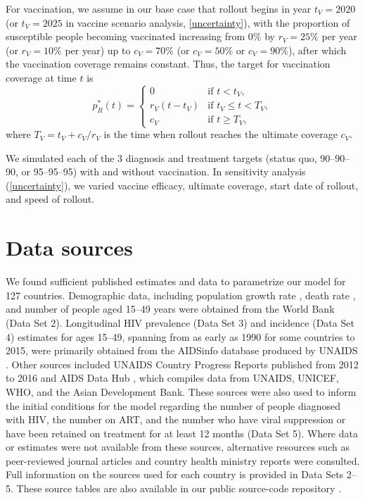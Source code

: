 \documentclass{article}
\begin{document}
For vaccination, we assume in our base case that rollout begins in
year $t_V = 2020$ (or $t_V = 2025$ in vaccine scenario analysis,
\autoref{uncertainty}), with the proportion of susceptible people
becoming vaccinated increasing from 0\% by $r_V = 25\%$ per year (or
$r_V = 10\%$ per year) up to $c_V = 70\%$ (or $c_V = 50\%$ or
$c_V = 90\%$), after which the vaccination coverage remains constant.
Thus, the target for vaccination coverage at time $t$ is
\begin{equation}
  \label{vaccination_target}
  p_R^*(t) =
  \begin{cases}
    0 & \text{if $t < t_V$},
    \\
    r_V (t - t_V) & \text{if $t_V \leq t < T_V$},
    \\
    c_V & \text{if $t \geq T_V$},
  \end{cases}
\end{equation}
where $T_V = t_V + c_V / r_V$ is the time when rollout reaches
the ultimate coverage $c_V$.

We simulated each of the 3 diagnosis and treatment targets (status
quo, 90--90--90, or 95--95--95) with and without vaccination.  In
sensitivity analysis (\autoref{uncertainty}), we varied vaccine
efficacy, ultimate coverage, start date of rollout, and speed of
rollout.


\section{Data sources}
\label{data_sources}

We found sufficient published estimates and data to parametrize our
model for 127 countries.  Demographic data, including population
growth rate \cite{WorldBankpg}, death
rate \cite{World_Development_Indicators2013-ee}, and number of people
aged 15--49 years \cite{The_World_Bank2016-fd} were obtained from the
World Bank (Data Set 2). Longitudinal HIV prevalence
(Data Set 3) and incidence (Data Set 4)
estimates for ages 15--49, spanning from as early as 1990 for some
countries to 2015, were primarily obtained from the AIDSinfo database
produced by UNAIDS \cite{Unaids2016-an}. Other sources included UNAIDS
Country Progress Reports \cite{Unaids2016-am} published from 2012 to
2016 and AIDS Data Hub \cite{AIDSdatahub-fg}, which compiles data from
UNAIDS, UNICEF, WHO, and the Asian Development Bank.  These sources
were also used to inform the initial conditions for the model
regarding the number of people diagnosed with HIV, the number on ART,
and the number who have viral suppression or have been retained on
treatment for at least 12 months (Data Set 5).  Where data
or estimates were not available from these sources, alternative
resources such as peer-reviewed journal articles and country health
ministry reports were consulted.  Full information on the sources used
for each country is provided in Data Sets 2--5.  These
source tables are also available in our public source-code
repository \cite{medlock2016-git}.
\end{document}
